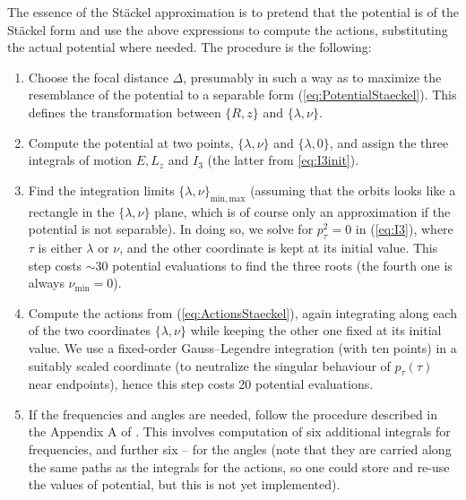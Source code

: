 \documentclass[12pt]{article}
\begin{document}
The essence of the St\"ackel approximation is to pretend that the potential is of the St\"ackel form and use the above expressions to compute the actions, substituting the actual potential where needed. The procedure is the following:
\begin{enumerate}
\item Choose the focal distance $\Delta$, presumably in such a way as to maximize the resemblance of the potential to a separable form (\ref{eq:PotentialStaeckel}). This defines the transformation between $\{R,z\}$ and $\{\lambda,\nu\}$.
\item Compute the potential at two points, $\{\lambda,\nu\}$ and $\{\lambda,0\}$, and assign the three integrals of motion $E, L_z$ and $I_3$ (the latter from \ref{eq:I3init}).
\item Find the integration limits $\{\lambda,\nu\}_\mathrm{min,max}$ (assuming that the orbits looks like a rectangle in the $\{\lambda,\nu\}$ plane, which is of course only an approximation if the potential is not separable). In doing so, we solve for $p_\tau^2=0$ in (\ref{eq:I3}), where $\tau$ is either $\lambda$ or $\nu$, and the other coordinate is kept at its initial value.
This step costs $\sim 30$ potential evaluations to find the three roots (the fourth one is always $\nu_\mathrm{min}=0$).
\item Compute the actions from (\ref{eq:ActionsStaeckel}), again integrating along each of the two coordinates $\{\lambda,\nu\}$ while keeping the other one fixed at its initial value.
We use a fixed-order Gauss--Legendre integration (with ten points) in a suitably scaled coordinate (to neutralize the singular behaviour of $p_\tau(\tau)$ near endpoints), hence this step costs 20 potential evaluations.
\item If the frequencies and angles are needed, follow the procedure described in the Appendix A of  \cite{Sanders2012}. This involves computation of six additional integrals for frequencies, and further six -- for the angles (note that they are carried along the same paths as the integrals for the actions, so one could store and re-use the values of potential, but this is not yet implemented).
\end{enumerate}
\end{document}

